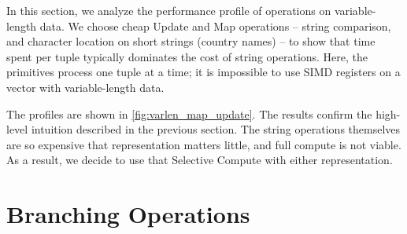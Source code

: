 \documentclass[12pt]{cmuthesis}
\begin{document}
In this section, we analyze the performance profile of operations on variable-length data. We choose cheap Update and Map operations -- string comparison, and character location on short strings (country names) -- to show that time spent per tuple typically dominates the cost of string operations. Here, the primitives process one tuple at a time; it is impossible to use SIMD registers on a vector with variable-length data.

The profiles are shown in \cref{fig:varlen_map_update}. The results confirm the high-level intuition described in the previous section. The string operations themselves are so expensive that representation matters little, and full compute is not viable. As a result, we decide to use that Selective Compute with either representation.

\section{Branching Operations}
\end{document}
